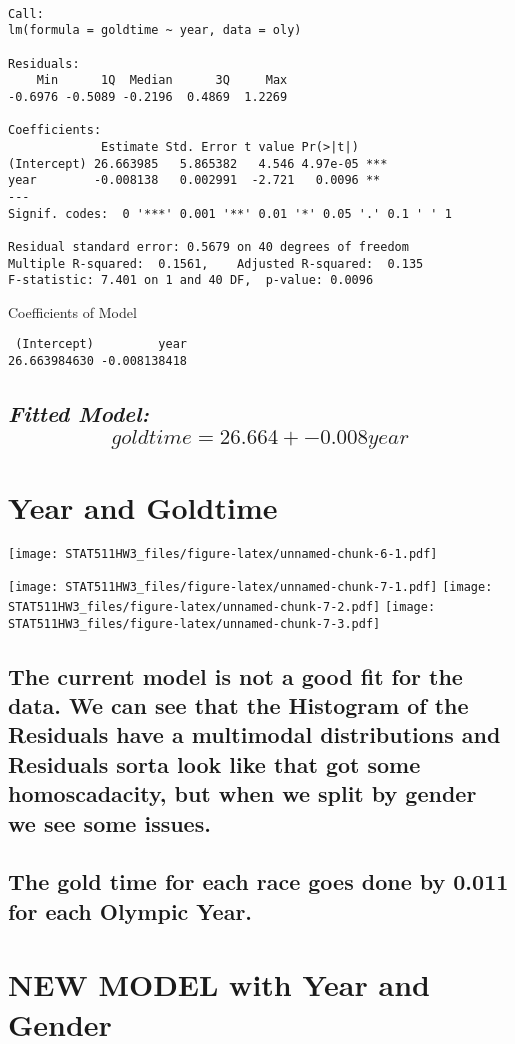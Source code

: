 \documentclass[]{article}
\begin{document}
\begin{verbatim}

Call:
lm(formula = goldtime ~ year, data = oly)

Residuals:
    Min      1Q  Median      3Q     Max 
-0.6976 -0.5089 -0.2196  0.4869  1.2269 

Coefficients:
             Estimate Std. Error t value Pr(>|t|)    
(Intercept) 26.663985   5.865382   4.546 4.97e-05 ***
year        -0.008138   0.002991  -2.721   0.0096 ** 
---
Signif. codes:  0 '***' 0.001 '**' 0.01 '*' 0.05 '.' 0.1 ' ' 1

Residual standard error: 0.5679 on 40 degrees of freedom
Multiple R-squared:  0.1561,    Adjusted R-squared:  0.135 
F-statistic: 7.401 on 1 and 40 DF,  p-value: 0.0096
\end{verbatim}

Coefficients of Model

\begin{verbatim}
 (Intercept)         year 
26.663984630 -0.008138418 
\end{verbatim}

\subsection{\emph{Fitted Model:}
\[ goldtime = 26.664 + -0.008year \]}\label{fitted-model-goldtime-26.664--0.008year}

\section{Year and Goldtime}\label{year-and-goldtime}

\texttt{[image: STAT511HW3\_files/figure-latex/unnamed-chunk-6-1.pdf]}

\texttt{[image: STAT511HW3\_files/figure-latex/unnamed-chunk-7-1.pdf]}
\texttt{[image: STAT511HW3\_files/figure-latex/unnamed-chunk-7-2.pdf]}
\texttt{[image: STAT511HW3\_files/figure-latex/unnamed-chunk-7-3.pdf]}

\subsection{The current model is not a good fit for the data. We can see
that the Histogram of the Residuals have a multimodal distributions and
Residuals sorta look like that got some homoscadacity, but when we split
by gender we see some
issues.}\label{the-current-model-is-not-a-good-fit-for-the-data.-we-can-see-that-the-histogram-of-the-residuals-have-a-multimodal-distributions-and-residuals-sorta-look-like-that-got-some-homoscadacity-but-when-we-split-by-gender-we-see-some-issues.}

\subsection{The gold time for each race goes done by 0.011 for each
Olympic
Year.}\label{the-gold-time-for-each-race-goes-done-by-0.011-for-each-olympic-year.}

\section{NEW MODEL with Year and
Gender}\label{new-model-with-year-and-gender}
\end{document}

